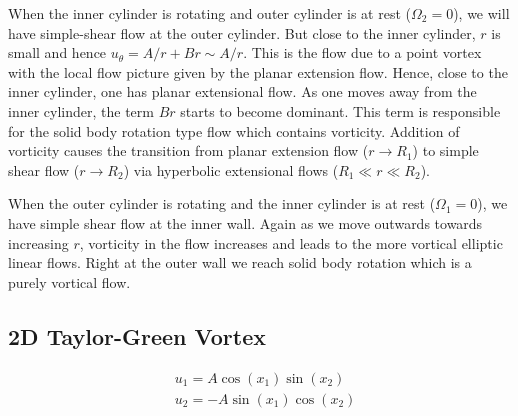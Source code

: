 \documentclass[11pt,a4paper]{article}
\newcommand{\1}{\vect{1}}
\begin{document}
When the inner cylinder is rotating and outer cylinder is at rest ($\Omega_2 = 0$), we will have simple-shear flow at the outer cylinder. But close to the inner cylinder, $r$ is small and hence $u_{\theta} = A/r + Br \sim A/r$. This is the flow due to a point vortex with the local flow picture given by the planar extension flow. Hence, close to the inner cylinder, one has planar extensional flow. As one moves away from the inner cylinder, the term $Br$ starts to become dominant. This term is responsible for the solid body rotation type flow which contains vorticity. Addition of vorticity causes the transition from planar extension flow ($r \to R_1$) to simple shear flow ($r \to R_2$) via hyperbolic extensional flows ($R_1 \ll r \ll R_2$).

When the outer cylinder is rotating and the inner cylinder is at rest ($\Omega_1 = 0$), we have simple shear flow at the inner wall. Again as we move outwards towards increasing $r$, vorticity in the flow increases and leads to the more vortical elliptic linear flows. Right at the outer wall we reach solid body rotation which is a purely vortical flow.

\subsection{2D Taylor-Green Vortex}
\begin{align*}
&u_1 =  A \cos(x_1)\sin(x_2)\\
&u_2 = -A \sin(x_1)\cos(x_2)
\end{align*}
\end{document}
